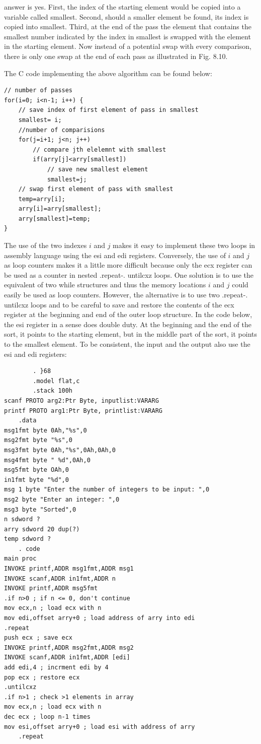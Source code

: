 \documentclass[10pt]{book}
\begin{document}
answer is yes. First, the index of the starting element would be copied into a variable called smallest. Second, should a smaller element be found, its index is copied into smallest. Third, at the end of the pass the element that contains the smallest number indicated by the index in smallest is swapped with the element in the starting element. Now instead of a potential swap with every comparison, there is only one swap at the end of each pass as illustrated in Fig. 8.10.

The C code implementing the above algorithm can be found below:

\begin{verbatim}
// number of passes
for(i=0; i<n-1; i++) {
    // save index of first element of pass in smallest
    smallest= i;
    //number of comparisions
    for(j=i+1; j<n; j++)
        // compare jth elelemnt with smallest
        if(arry[j]<arry[smallest])
            // save new smallest element
            smallest=j;
    // swap first element of pass with smallest
    temp=arry[i];
    arry[i]=arry[smallest];
    arry[smallest]=temp;
}
\end{verbatim}

The use of the two indexes $i$ and $j$ makes it easy to implement these two loops in assembly language using the esi and edi registers. Conversely, the use of $i$ and $j$ as loop counters makes it a little more difficult because only the ecx register can be used as a counter in nested .repeat-. untilcxz loops. One solution is to use the equivalent of two while structures and thus the memory locations $i$ and $j$ could easily be used as loop counters. However, the alternative is to use two .repeat-. untilcxz loops and to be careful to save and restore the contents of the ecx register at the beginning and end of the outer loop structure. In the code below, the esi register in a sense does double duty. At the beginning and the end of the sort, it points to the starting element, but in the middle part of the sort, it points to the smallest element. To be consistent, the input and the output also use the esi and edi registers:

\begin{verbatim}
        . }68
        .model flat,c
        .stack 100h
scanf PROTO arg2:Ptr Byte, inputlist:VARARG
printf PROTO arg1:Ptr Byte, printlist:VARARG
    .data
msg1fmt byte 0Ah,"%s",0
msg2fmt byte "%s",0
msg3fmt byte 0Ah,"%s",0Ah,0Ah,0
msg4fmt byte " %d",0Ah,0
msg5fmt byte OAh,0
in1fmt byte "%d",0
msg 1 byte "Enter the number of integers to be input: ",0
msg2 byte "Enter an integer: ",0
msg3 byte "Sorted",0
n sdword ?
arry sdword 20 dup(?)
temp sdword ?
    . code
main proc
INVOKE printf,ADDR msg1fmt,ADDR msg1
INVOKE scanf,ADDR in1fmt,ADDR n
INVOKE printf,ADDR msg5fmt
.if n>0 ; if n <= 0, don't continue
mov ecx,n ; load ecx with n
mov edi,offset arry+0 ; load address of arry into edi
.repeat
push ecx ; save ecx
INVOKE printf,ADDR msg2fmt,ADDR msg2
INVOKE scanf,ADDR in1fmt,ADDR [edi]
add edi,4 ; incrment edi by 4
pop ecx ; restore ecx
.untilcxz
.if n>1 ; check >1 elements in array
mov ecx,n ; load ecx with n
dec ecx ; loop n-1 times
mov esi,offset arry+0 ; load esi with address of arry
    .repeat
\end{verbatim}
\end{document}
